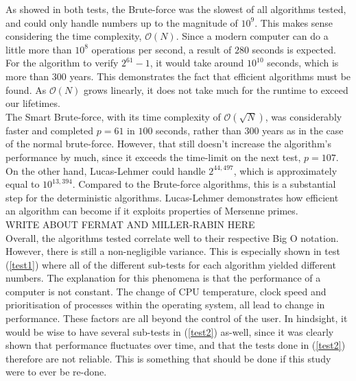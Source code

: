 \documentclass[main.tex]{subfiles}
\begin{document}

As showed in both tests, the Brute-force was the slowest of all algorithms
tested, and could only handle numbers up to the magnitude of $10^{9}$. This
makes sense considering the time complexity, $\mathcal{O}(N)$. Since a modern
computer can do a little more than $10^{8}$ operations per second, a result of
$280$ seconds is expected. For the algorithm to verify $2^{61}-1$, it would take
around $10^{10}$ seconds, which is more than $300$ years. This demonstrates the
fact that efficient algorithms must be found. As $\mathcal{O}(N)$ grows
linearly, it does not take much for the runtime to exceed our lifetimes. \\

The Smart Brute-force, with its time complexity of $\mathcal{O}(\sqrt{N})$, was
considerably faster and completed $p=61$ in $100$ seconds, rather than $300$
years as in the case of the normal brute-force. However, that still doesn't
increase the algorithm's performance by much, since it exceeds the time-limit on
the next test, $p=107$. \\

On the other hand, Lucas-Lehmer could handle $2^{44,497}$, which is approximately
equal to $10^{13,394}$. Compared to the Brute-force algorithms, this is a
substantial step for the deterministic algorithms. Lucas-Lehmer demonstrates
how efficient an algorithm can become if it exploits properties of Mersenne primes. \\

WRITE ABOUT FERMAT AND MILLER-RABIN HERE \\

Overall, the algorithms tested correlate well to their respective Big O
notation. However, there is still a non-negligible variance. This is especially
shown in test (\ref{test1}) where all of the different sub-tests for each
algorithm yielded different numbers. The explanation for this phenomena is that
the performance of a computer is not constant. The change of CPU temperature,
clock speed and prioritisation of processes within the operating system, all
lead to change in performance. These factors are all beyond the control of the
user. In hindsight, it would be wise to have several sub-tests in (\ref{test2})
as-well, since it was clearly shown that performance fluctuates over time, and
that the tests done in (\ref{test2}) therefore are not reliable. This is
something that should be done if this study were to ever be re-done. \\
\end{document}
